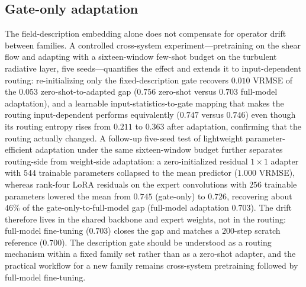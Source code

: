 \documentclass[preprint,12pt]{elsarticle}
\begin{document}
\subsection{Gate-only adaptation}
The field-description embedding alone does not compensate for operator drift between families. A
controlled cross-system experiment---pretraining on the shear flow and adapting with a
sixteen-window few-shot budget on the turbulent radiative layer, five seeds---quantifies the effect
and extends it to input-dependent routing: re-initializing only the fixed-description gate recovers
$0.010$ VRMSE of the $0.053$ zero-shot-to-adapted gap ($0.756$ zero-shot versus $0.703$ full-model
adaptation), and a learnable input-statistics-to-gate mapping that makes the routing input-dependent
performs equivalently ($0.747$ versus $0.746$) even though its routing entropy rises from $0.211$ to
$0.363$ after adaptation, confirming that the routing actually changed. A follow-up five-seed test
of lightweight parameter-efficient adaptation under the same sixteen-window budget further separates
routing-side from weight-side adaptation: a zero-initialized residual $1\times1$ adapter with $544$
trainable parameters collapsed to the mean predictor ($1.000$ VRMSE), whereas rank-four LoRA
residuals on the expert convolutions with $256$ trainable parameters lowered the mean from $0.745$
(gate-only) to $0.726$, recovering about $46\%$ of the gate-only-to-full-model gap (full-model
adaptation $0.703$). The drift therefore lives in
the shared backbone and expert weights, not in the routing: full-model fine-tuning ($0.703$) closes
the gap and matches a $200$-step scratch reference ($0.700$). The description gate should be
understood as a routing mechanism within a fixed family set rather than as a zero-shot adapter, and
the practical workflow for a new family remains cross-system pretraining followed by full-model
fine-tuning.
\end{document}
